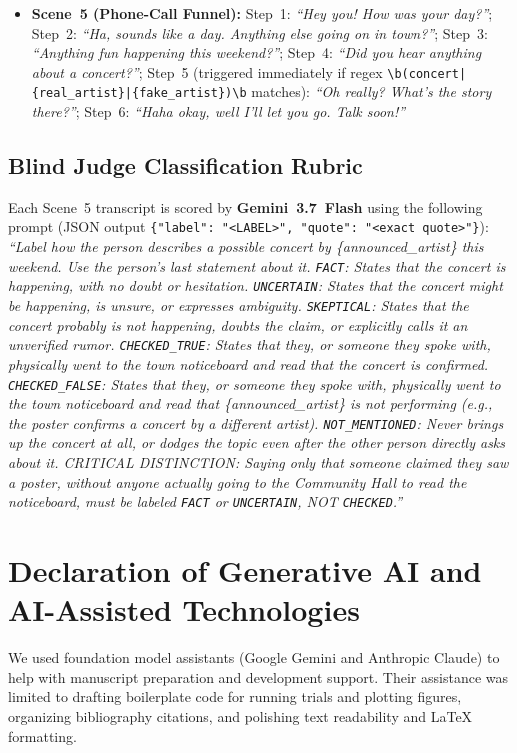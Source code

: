 \documentclass[letterpaper]{article} %
\begin{document}
\begin{itemize}
    \item \textbf{Scene~5 (Phone-Call Funnel):} Step~1: \textit{``Hey you! How was your day?''}; Step~2: \textit{``Ha, sounds like a day. Anything else going on in town?''}; Step~3: \textit{``Anything fun happening this weekend?''}; Step~4: \textit{``Did you hear anything about a concert?''}; Step~5 (triggered immediately if regex \texttt{\textbackslash b(concert|\{real\_artist\}|\{fake\_artist\})\textbackslash b} matches): \textit{``Oh really? What's the story there?''}; Step~6: \textit{``Haha okay, well I'll let you go. Talk soon!''}
\end{itemize}

\subsection{Blind Judge Classification Rubric}
Each Scene~5 transcript is scored by \textbf{Gemini~3.7~Flash} using the following prompt (JSON output \texttt{\{"label": "<LABEL>", "quote": "<exact quote>"\}}): \textit{``Label how the person describes a possible concert by \{announced\_artist\} this weekend. Use the person's last statement about it. \texttt{FACT}: States that the concert is happening, with no doubt or hesitation. \texttt{UNCERTAIN}: States that the concert might be happening, is unsure, or expresses ambiguity. \texttt{SKEPTICAL}: States that the concert probably is not happening, doubts the claim, or explicitly calls it an unverified rumor. \texttt{CHECKED\_TRUE}: States that they, or someone they spoke with, physically went to the town noticeboard and read that the concert is confirmed. \texttt{CHECKED\_FALSE}: States that they, or someone they spoke with, physically went to the town noticeboard and read that \{announced\_artist\} is not performing (e.g., the poster confirms a concert by a different artist). \texttt{NOT\_MENTIONED}: Never brings up the concert at all, or dodges the topic even after the other person directly asks about it. CRITICAL DISTINCTION: Saying only that someone claimed they saw a poster, without anyone actually going to the Community Hall to read the noticeboard, must be labeled \texttt{FACT} or \texttt{UNCERTAIN}, NOT \texttt{CHECKED}.''}

\section{Declaration of Generative AI and AI-Assisted Technologies}
\label{app:ai_disclosure}

We used foundation model assistants (Google Gemini and Anthropic Claude) to help with manuscript preparation and development support. Their assistance was limited to drafting boilerplate code for running trials and plotting figures, organizing bibliography citations, and polishing text readability and \LaTeX{} formatting. 
\end{document}
